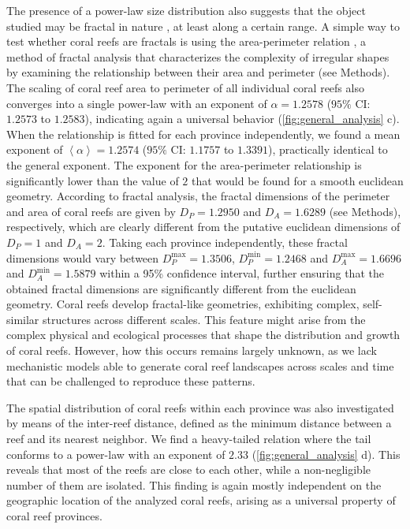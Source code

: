 The presence of a power-law size distribution also suggests that the object
studied may be fractal in nature \cite{Mori2020, PINTO2014, Seekell2013,
    Sorensen1999, Vidondo1997}, at least along a certain range. A simple way to
test whether coral reefs are fractals is using the area-perimeter relation
\cite{MAN83, Lovejoy1982}, a method of fractal analysis that characterizes the
complexity of irregular shapes by examining the relationship between their area
and perimeter (see Methods). The scaling of coral reef area to perimeter of all
individual coral reefs also converges into a single power-law with an exponent
of $\alpha=1.2578$ ($95\%$ CI: $1.2573$ to $1.2583$), indicating again a
universal behavior (\cref{fig:general_analysis} c). When the relationship is
fitted for each province independently, we found a mean exponent of
$\left<\alpha\right>=1.2574$ ($95\%$ CI: $1.1757$ to $1.3391$), practically
identical to the general exponent. The exponent for the area-perimeter
relationship is significantly lower than the value of $2$ that would be found
for a smooth euclidean geometry. According to fractal analysis, the fractal
dimensions of the perimeter and area of coral reefs are given by $D_P=1.2950$
and $D_A=1.6289$ (see Methods), respectively, which are clearly different from
the putative euclidean dimensions of $D_P=1$ and $D_A=2$. Taking each province
independently, these fractal dimensions would vary between
$D_P^{\mathrm{max}}=1.3506$, $D_P^{\mathrm{min}}=1.2468$ and
$D_A^{\mathrm{max}}=1.6696$ and $D_A^{\mathrm{min}}=1.5879$ within a 95\%
confidence interval, further ensuring that the obtained fractal dimensions are
significantly different from the euclidean geometry. Coral reefs develop
fractal-like geometries, exhibiting complex, self-similar structures across
different scales. This feature might arise from the complex physical and
ecological processes that shape the distribution and growth of coral reefs.
However, how this occurs remains largely unknown, as we lack mechanistic models
able to generate coral reef landscapes across scales and time that can be
challenged to reproduce these patterns.

The spatial distribution of coral reefs within each province was also
investigated by means of the inter-reef distance, defined as the minimum
distance between a reef and its nearest neighbor. We find a heavy-tailed
relation where the tail conforms to a power-law with an exponent of $2.33$
(\cref{fig:general_analysis} d). This reveals that most of the reefs are close
to each other, while a non-negligible number of them are isolated. This finding
is again mostly independent on the geographic location of the analyzed coral
reefs, arising as a universal property of coral reef provinces.

